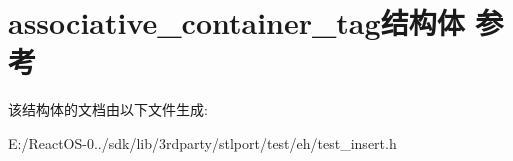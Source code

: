 \hypertarget{structassociative__container__tag}{}\section{associative\+\_\+container\+\_\+tag结构体 参考}
\label{structassociative__container__tag}


该结构体的文档由以下文件生成\+:\begin{DoxyCompactItemize}
\item 
E\+:/\+React\+O\+S-\/0../sdk/lib/3rdparty/stlport/test/eh/test\+\_\+insert.\+h\end{DoxyCompactItemize}
